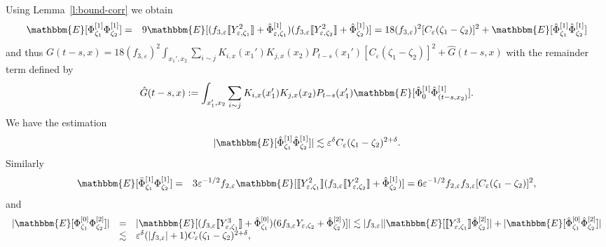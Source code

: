Using Lemma~\ref{l:bound-corr} we obtain
\begin{eqnarray*}
  \mathbbm{E} [\Phi^{[1]}_{\zeta_1} \Phi^{[1]}_{\zeta_2}] & = & 9\mathbbm{E}
  [(f_{3, \varepsilon} \llbracket Y^2_{\varepsilon, \zeta_1} \rrbracket +
  \hat{\Phi}^{[1]}_{\varepsilon, \zeta_1}) (f_{3, \varepsilon} \llbracket
  Y^2_{\varepsilon, \zeta_2} \rrbracket + \hat{\Phi}^{[1]}_{\zeta_2})] = 18
  (f_{3, \varepsilon})^2  [C_{\varepsilon} (\zeta_1 - \zeta_2)]^2 +\mathbbm{E}
  [\hat{\Phi}^{[1]}_{\zeta_1} \hat{\Phi}^{[1]}_{\zeta_2}]
\end{eqnarray*}
and thus $G (t - s, x) = 18 (f_{3, \varepsilon})^2 \int_{x_1', x_2}  \sum_{i
\sim j} K_{i, x} (x_1') K_{j, x} (x_2) P_{t - s} (x_1') [C_{\varepsilon}
(\zeta_1 - \zeta_2)]^2 + \hat{G} (t - s, x)$ with the remainder term defined
by
\[ \hat{G} (t - s, x) \assign \int_{x_1', x_2}  \sum_{i \sim j} K_{i, x}
   (x_1') K_{j, x} (x_2) P_{t - s} (x_1') \mathbbm{E} [\hat{\Phi}^{[1]}_0
   \hat{\Phi}^{[1]}_{(t - s, x_2)}] . \]
We have the estimation
\begin{equation}
  | \mathbbm{E} [\hat{\Phi}^{[1]}_{\zeta_1} \hat{\Phi}^{[1]}_{\zeta_2}] |
  \lesssim \varepsilon^{\delta} C_{\varepsilon} (\zeta_1 - \zeta_2)^{2 +
  \delta} . \label{e:bound-corr-11}
\end{equation}
Similarly
\begin{eqnarray*}
  \mathbbm{E} [\bar{\Phi}^{[1]}_{\zeta_1} \Phi^{[1]}_{\zeta_2}] & = & 3
  \varepsilon^{- 1 / 2} f_{2, \varepsilon} \mathbbm{E} [\llbracket
  Y^2_{\varepsilon, \zeta_1} \rrbracket (f_{3, \varepsilon} \llbracket
  Y^2_{\varepsilon, \zeta_2} \rrbracket + \hat{\Phi}^{[1]}_{\zeta_2})] = 6
  \varepsilon^{- 1 / 2} f_{2, \varepsilon} f_{3, \varepsilon} [C_{\varepsilon}
  (\zeta_1 - \zeta_2)]^2,
\end{eqnarray*}
and
\begin{equation}
  \begin{array}{lll}
    | \mathbbm{E} [\Phi^{[0]}_{\zeta_1} \Phi^{[2]}_{\zeta_2}] | & = & |
    \mathbbm{E} [(f_{3, \varepsilon} \llbracket Y^3_{\varepsilon, \zeta_1}
    \rrbracket + \hat{\Phi}^{[0]}_{\zeta_1}) (6 f_{3, \varepsilon}
    Y_{\varepsilon, \zeta_2} + \hat{\Phi}^{[2]}_{\zeta_2})] | \lesssim | f_{3,
    \varepsilon} | | \mathbbm{E} [\llbracket Y^3_{\varepsilon, \zeta_1}
    \rrbracket \hat{\Phi}^{[2]}_{\zeta_2}] | + | \mathbbm{E}
    [\hat{\Phi}^{[0]}_{\zeta_1} \hat{\Phi}^{[2]}_{\zeta_2}] |\\
    & \lesssim & \varepsilon^{\delta} (| f_{3, \varepsilon} | + 1)
    C_{\varepsilon} (\zeta_1 - \zeta_2)^{2 + \delta},
  \end{array} \label{e:bound-corr-02}
\end{equation}
